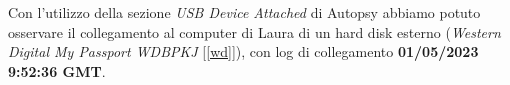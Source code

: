 Con l'utilizzo della sezione \textit{USB Device Attached} di Autopsy abbiamo potuto osservare il collegamento al computer di Laura di un hard disk esterno (\textit{Western Digital My Passport WDBPKJ} [\ref{wd}]), con log di collegamento \textbf{01/05/2023 9:52:36 GMT}.